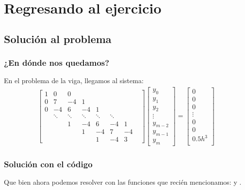 \documentclass[12pt]{beamer}
\begin{document}
\section{Regresando al ejercicio}
\subsection{Solución al problema}

\begin{frame}
\frametitle{¿En dónde nos quedamos?}
En el problema de la viga, llegamos al sistema:
\renewcommand{\arraystretch}{0.9}
\begin{align*}
\begin{bmatrix}
1 & 0 & 0 & & & & & \\
0 & 7 & -4 & 1 & & & & \\
0 & -4 & 6 & -4 & 1 & & & \\
 & \ddots & \ddots & \ddots & \ddots & \ddots & & \\
 & & 1 & -4 & 6 & -4 & 1 \\
 & & & 1 & -4 & 7 & -4 \\
 & & & & 1 & -4 & 3
\end{bmatrix}
\begin{bmatrix}
y_{0} \\
y_{1} \\
y_{2} \\
\vdots \\
y_{m-2} \\
y_{m-1} \\
y_{m}
\end{bmatrix}
=
\begin{bmatrix}
0 \\
0 \\
0 \\
\vdots \\
0 \\
0 \\
0.5 h^{3} \\
\end{bmatrix}
\end{align*}
\end{frame}
\begin{frame}
\frametitle{Solución con el código}
Que bien ahora podemos resolver con las funciones que recién mencionamos:  y .
\end{frame}
\end{document}
